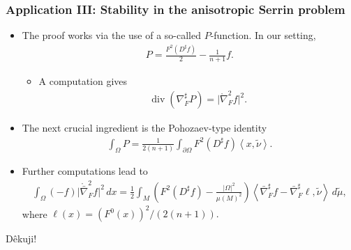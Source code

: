 \documentclass{beamer}
\newcommand{\ti}{\tilde}
\newcommand{\mr}{\mathring}
\newcommand{\8}{\infty}
\newcommand{\Om}{\Omega}
\newcommand{\del}{\partial}
\newcommand{\n}{\nabla}
\newcommand{\ip}[2]{\left\langle #1,#2 \right\rangle}
\newcommand{\fr}[2]{\frac{#1}{#2}}
\DeclareMathOperator{\dive}{div}
\newcommand{\eq}[1]{\begin{equation}\begin{alignedat}{2} #1 \end{alignedat}\end{equation}}
\newcommand{\br}[1]{\left(#1\right)}
\newcommand{\abs}[1]{\lvert #1\rvert}
\begin{document}
\begin{frame} 
\frametitle{Application III: Stability in the anisotropic Serrin problem}

\begin{itemize}
\item The proof works via the use of a so-called $P$-function. In our setting,
\eq{P=\fr{F^{2}(D^{\sharp}f)}{2}-\fr{1}{n+1}f.}
	\begin{itemize}
		\item A computation gives
			\eq{\dive(\n^{\sharp}_{F}P) = \abs{\mr\n^{2}_{F}f}^{2}.}
	\end{itemize}
\item The next crucial ingredient is the Pohozaev-type identity
\eq{\int_{\Om}P = \fr{1}{2(n+1)}\int_{\del\Om}F^{2}(D^{\sharp}f)\ip{x}{\ti \nu}.}
\item Further computations lead to
\eq{\label{eq-integral-identity-OverDetermined}
    \int_\Om (-f)\vert\mathring{\bar\n}_{F}^2f\vert^2\,d x
    =\frac12\int_{M}\br{F^2(D^\sharp f)-\fr{\abs{\Om}^{2}}{\mu(M)^{2}}}\left<\bar\nabla^\sharp_Ff-\bar\nabla^\sharp_F\ell,\tilde\nu\right>\,d\tilde\mu,}
    where $\ell(x) = (F^{0}(x))^{2}/(2(n+1)).$
    \end{itemize}

\end{frame}



























 







\begin{frame}
\begin{center}\Huge D\^{e}kuji! \end{center}

 \end{frame}

















\end{document}
